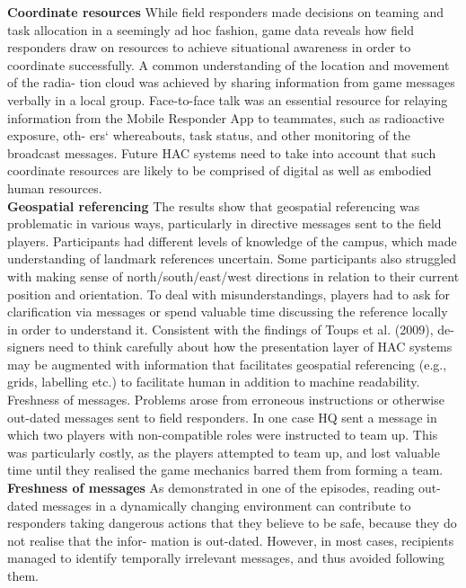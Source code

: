 \textbf{Coordinate resources} While field responders made decisions on teaming and task allocation in a seemingly ad hoc fashion, game data reveals how field responders draw on resources to achieve situational awareness in order to coordinate successfully. A common understanding of the location and movement of the radia- tion cloud was achieved by sharing information from game messages verbally in a local group. Face-to-face talk was an essential resource for relaying information from the Mobile Responder App to teammates, such as radioactive exposure, oth- ers` whereabouts, task status, and other monitoring of the broadcast messages. Future HAC systems need to take into account that such coordinate resources are likely to be comprised of digital as well as embodied human resources. \\

\textbf{Geospatial referencing} The results show that geospatial referencing was problematic in various ways, particularly in directive messages sent to the field players. Participants had different levels of knowledge of the campus, which made understanding of landmark references uncertain. Some participants also struggled with making sense of north/south/east/west directions in relation to their current position and orientation. To deal with misunderstandings, players had to ask for clarification via messages or spend valuable time discussing the reference locally in order to understand it. Consistent with the findings of Toups et al. (2009), de- signers need to think carefully about how the presentation layer of HAC systems may be augmented with information that facilitates geospatial referencing (e.g., grids, labelling etc.) to facilitate human in addition to machine readability. Freshness of messages. Problems arose from erroneous instructions or otherwise out-dated messages sent to field responders. In one case HQ sent a message in which two players with non-compatible roles were instructed to team up. This was particularly costly, as the players attempted to team up, and lost valuable time until they realised the game mechanics barred them from forming a team.\\

\textbf{Freshness of messages} As demonstrated in one of the episodes, reading out-dated messages in a dynamically changing environment can contribute to responders taking dangerous actions that they believe to be safe, because they do not realise that the infor- mation is out-dated. However, in most cases, recipients managed to identify temporally irrelevant messages, and thus avoided following them.\\

